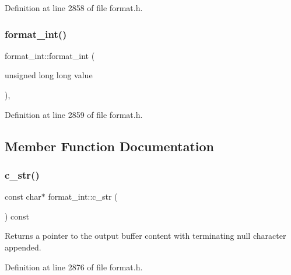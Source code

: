 Definition at line 2858 of file format.\+h.

\mbox{\label{classformat__int_a04c207f578ee7611d897c77ab4a34ff0}} 
\subsubsection{\texorpdfstring{format\+\_\+int()}{format\_int()}\hspace{0.1cm}{\footnotesize\ttfamily [6/6]}}
{\footnotesize\ttfamily format\+\_\+int\+::format\+\_\+int (\begin{DoxyParamCaption}\item[{unsigned long long}]{value }\end{DoxyParamCaption})\hspace{0.3cm}{\ttfamily [inline]}, {\ttfamily [explicit]}}



Definition at line 2859 of file format.\+h.



\subsection{Member Function Documentation}
\mbox{\label{classformat__int_a0ae1671f3ddacb00738133f29549b724}} 
\subsubsection{\texorpdfstring{c\+\_\+str()}{c\_str()}}
{\footnotesize\ttfamily const char$\ast$ format\+\_\+int\+::c\+\_\+str (\begin{DoxyParamCaption}{ }\end{DoxyParamCaption}) const\hspace{0.3cm}{\ttfamily [inline]}}

Returns a pointer to the output buffer content with terminating null character appended. 

Definition at line 2876 of file format.\+h.

\mbox{\label{classformat__int_a4ecc95eeed01911d1e2dcc4fabc5df5a}} 

